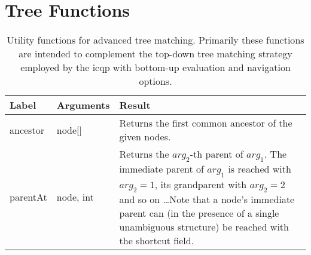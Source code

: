 \documentclass[11pt,a4paper]{report}
\begin{document}
\section{Tree Functions}
\label{sec:tree-functions}

\begin{table}[!htb]\centering
	\begin{tabular}{|p{}|p{}|p{}|}
		\hline 
		\textbf{Label} & \textbf{Arguments} & \textbf{Result} \\ 
		\hline 
		\hline  
		ancestor & node[] & Returns the first common ancestor of the given nodes. \\ 
		\hline  
		parentAt & node, int & Returns the $arg_2$-th parent of $arg_1$. The immediate parent of $arg_1$ is reached with $arg_2 = 1$, its grandparent with $arg_2 = 2$ and so on \dots Note that a node's immediate parent can (in the presence of a single unambiguous structure) be reached with the \query{parent} shortcut field. \\ 
		\hline 
	\end{tabular}
	\caption[Tree functions]{Utility functions for advanced tree matching. Primarily these functions are intended to complement the top-down tree matching strategy employed by the \ac{icqp} with bottom-up evaluation and navigation options.}
	\label{tab:tree-functions}
\end{table}
\end{document}
